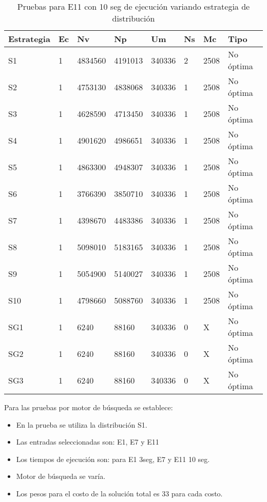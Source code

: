 \begin{center}
\begin{longtable}{|p{3cm}|p{1.0cm}|p{1.6cm}|p{1.6cm}|p{1.1cm}|p{1.1cm}|p{1.1cm}|p{2.7cm}|}
	\caption{Pruebas para E11 con 10 seg de ejecución variando estrategia de distribución} \\
	\hline
	\cellcolor[gray]{0.9} \textbf{Estrategia} & \cellcolor[gray]{0.9}\textbf{Ec} & \cellcolor[gray]{0.9}\textbf{Nv} & \cellcolor[gray]{0.9}\textbf{Np} & \cellcolor[gray]{0.9}\textbf{Um} & \cellcolor[gray]{0.9}\textbf{Ns} &  \cellcolor[gray]{0.9}\textbf{Mc} & \cellcolor[gray]{0.9}\textbf{Tipo}\\	\hline
	S1& 1 &4834560  &4191013 &340336  &2 &2508&No óptima \\
	\hline
	S2& 1 &4753130  &4838068 &340336  &1 &2508&No óptima \\
	\hline
	S3& 1 &4628590  &4713450 &340336  &1 &2508&No óptima \\
	\hline
	S4& 1 &4901620  &4986651 &340336  &1 &2508&No óptima \\
	\hline
	S5& 1 &4863300  &4948307 &340336  &1 &2508&No óptima \\
	\hline
	S6& 1 &3766390  &3850710 &340336  &1 &2508&No óptima \\
	\hline
	S7& 1 &4398670  &4483386 &340336  &1 &2508&No óptima \\
	\hline
	S8& 1 &5098010  &5183165 &340336  &1 &2508&No óptima \\
	\hline
	S9& 1 &5054900  &5140027 &340336  &1 &2508&No óptima \\
	\hline
	S10& 1 &4798660  &5088760 &340336  &1 &2508&No óptima \\
	\hline
	SG1& 1 &6240  &88160 &340336  &0 &X&No óptima \\
	\hline
	SG2& 1 &6240  &88160 &340336  &0 &X&No óptima \\
	\hline
	SG3& 1 &6240  &88160 &340336  &0 &X&No óptima \\
	\hline
\end{longtable}	
\end{center}

Para las pruebas por motor de búsqueda se establece:

\begin{itemize}
	\item En la prueba se utiliza la distribución S1.
	\item Las entradas seleccionadas son: E1, E7 y E11
	\item Los tiempos de ejecución son: para E1 3seg, E7 y E11 10 seg.
	\item Motor de búsqueda se varía.
	\item Los pesos para el costo de la solución total es 33 para cada costo.
\end{itemize}


